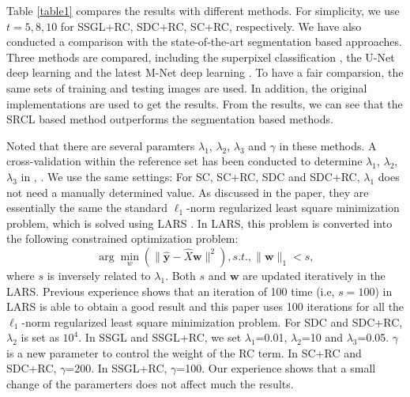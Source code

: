 \documentclass[journal]{IEEEtran}
\begin{document}
  Table \ref{table1} compares the results with different methods. For simplicity, we use $t=5, 8, 10$ for SSGL+RC, SDC+RC, SC+RC, respectively.  We have also conducted a comparison  with the state-of-the-art segmentation based approaches. Three methods are compared, including the superpixel classification \cite{tmi2013}, the U-Net deep learning \cite{Ronneberger2015} and the latest M-Net deep learning \cite{huazhu18}. To have a fair comparsion, the same sets of
  training and testing images are used. In addition, the original
  implementations are used to get the results. From the results, we can see that the SRCL based method outperforms the segmentation based methods. 
  

Noted that there are several paramters $\lambda_1$, $\lambda_2$, $\lambda_3$ and $\gamma$ in
these methods. A cross-validation within the reference set
has been conducted to determine  $\lambda_1$, $\lambda_2$, $\lambda_3$ in \cite{CJ15}, \cite{Cheng:17BOE}. We
use the same settings: For SC, SC+RC, SDC and SDC+RC, $\lambda_1$ does not need a manually determined value. As discussed
in the paper, they are essentially the same the standard $\ell_1$-norm regularized least square minimization problem, which is
solved using LARS \cite{lars2004}. In LARS, this problem is converted
into the following constrained optimization problem:
 \begin{equation}
\arg \min_{w} (\|\hat{\textbf{y}}-\hat{X}\textbf{w} \|^2), s.t., \|\textbf{w} \|_1 < s,
	\end{equation}
  where $s$ is inversely related to $\lambda_1$. Both $s$ and $\textbf{w}$ are updated 
 iteratively in the LARS. Previous experience \cite{CJ15} shows that
 an iteration of 100 time (i.e, $s=100$) in LARS is able to obtain
a good result and this paper uses 100 iterations for all the $\ell_1$-norm regularized least square minimization problem.
For SDC and SDC+RC, $\lambda_2$ is set as $10^4$.
In SSGL and SSGL+RC, we
 set $\lambda_1$=0.01, $\lambda_2$=10 and $\lambda_3$=0.05.
$\gamma$ is a new parameter to
control the weight of the RC term. In SC+RC and SDC+RC,
$\gamma$=200. In SSGL+RC, 
$\gamma$=100. Our experience shows that a
small change of the paramerters does not affect much the
results.
\end{document}
